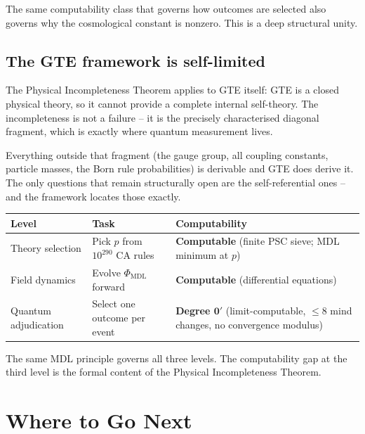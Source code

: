\documentclass[11pt,a4paper]{article}
\newcommand{\zerp}{\mathbf{0}'}
\begin{document}
The same computability class that governs how outcomes are selected also
governs why the cosmological constant is nonzero. This is a deep structural
unity.

\subsection{The GTE framework is self-limited}

The Physical Incompleteness Theorem applies to GTE itself: GTE is a closed
physical theory, so it cannot provide a complete internal self-theory.
The incompleteness is not a failure -- it is the precisely characterised
diagonal fragment, which is exactly where quantum measurement lives.

Everything outside that fragment (the gauge group, all coupling constants,
particle masses, the Born rule probabilities) is derivable and GTE does
derive it.  The only questions that remain structurally open are the
self-referential ones -- and the framework locates those exactly.

\begin{tcolorbox}[colback=boxred,colframe=red!40!black,
  title=Summary: The Three-Level Computability Picture]
\small
\begin{tabular}{@{}p{3.5cm}p{3.2cm}p{4.8cm}@{}}
\toprule
\textbf{Level} & \textbf{Task} & \textbf{Computability} \\
\midrule
Theory selection &
  Pick $p$ from $10^{290}$ CA rules &
  \textbf{Computable} (finite PSC sieve; MDL minimum at $p$) \\[4pt]
Field dynamics &
  Evolve $\Phi_{\mathrm{MDL}}$ forward &
  \textbf{Computable} (differential equations) \\[4pt]
Quantum adjudication &
  Select one outcome per event &
  \textbf{Degree $\zerp$} (limit-computable, $\leq 8$ mind changes,
  no convergence modulus) \\
\bottomrule
\end{tabular}
\vspace{4pt}
The same MDL principle governs all three levels.
The computability gap at the third level is the formal content of the
Physical Incompleteness Theorem.
\end{tcolorbox}

\section{Where to Go Next}
\label{sec:further}
\end{document}
